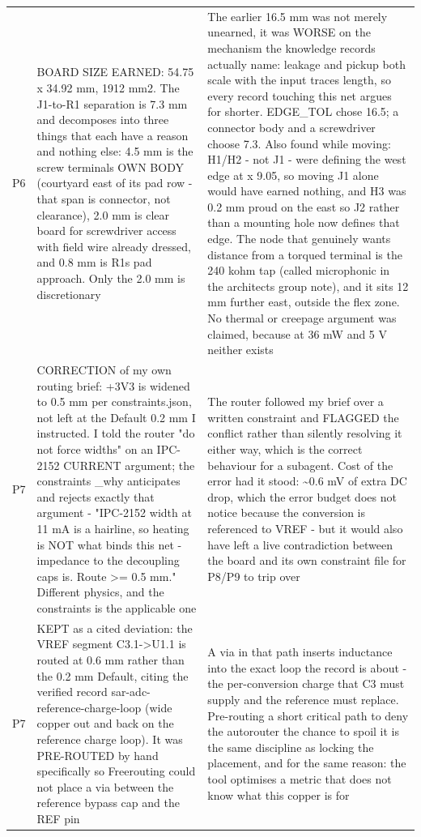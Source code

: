 \documentclass[11pt,a4paper]{article}
\begin{document}
{\begin{longtable}{lp{5.2cm}p{7.2cm}}
P6 & BOARD SIZE EARNED: 54.75 x 34.92 mm, 1912 mm2. The J1-to-R1 separation is 7.3 mm and decomposes into three things that each have a reason and nothing else: 4.5 mm is the screw terminals OWN BODY (courtyard east of its pad row - that span is connector, not clearance), 2.0 mm is clear board for screwdriver access with field wire already dressed, and 0.8 mm is R1s pad approach. Only the 2.0 mm is discretionary & The earlier 16.5 mm was not merely unearned, it was WORSE on the mechanism the knowledge records actually name: leakage and pickup both scale with the input traces length, so every record touching this net argues for shorter. EDGE\_TOL chose 16.5; a connector body and a screwdriver choose 7.3. Also found while moving: H1/H2 - not J1 - were defining the west edge at x 9.05, so moving J1 alone would have earned nothing, and H3 was 0.2 mm proud on the east so J2 rather than a mounting hole now defines that edge. The node that genuinely wants distance from a torqued terminal is the 240 kohm tap (called microphonic in the architects group note), and it sits 12 mm further east, outside the flex zone. No thermal or creepage argument was claimed, because at 36 mW and 5 V neither exists \\
P7 & CORRECTION of my own routing brief: +3V3 is widened to 0.5 mm per constraints.json, not left at the Default 0.2 mm I instructed. I told the router "do not force widths" on an IPC-2152 CURRENT argument; the constraints \_why anticipates and rejects exactly that argument - "IPC-2152 width at 11 mA is a hairline, so heating is NOT what binds this net - impedance to the decoupling caps is. Route \textgreater{}= 0.5 mm." Different physics, and the constraints is the applicable one & The router followed my brief over a written constraint and FLAGGED the conflict rather than silently resolving it either way, which is the correct behaviour for a subagent. Cost of the error had it stood: \textasciitilde{}0.6 mV of extra DC drop, which the error budget does not notice because the conversion is referenced to VREF - but it would also have left a live contradiction between the board and its own constraint file for P8/P9 to trip over \\
P7 & KEPT as a cited deviation: the VREF segment C3.1-\textgreater{}U1.1 is routed at 0.6 mm rather than the 0.2 mm Default, citing the verified record sar-adc-reference-charge-loop (wide copper out and back on the reference charge loop). It was PRE-ROUTED by hand specifically so Freerouting could not place a via between the reference bypass cap and the REF pin & A via in that path inserts inductance into the exact loop the record is about - the per-conversion charge that C3 must supply and the reference must replace. Pre-routing a short critical path to deny the autorouter the chance to spoil it is the same discipline as locking the placement, and for the same reason: the tool optimises a metric that does not know what this copper is for \\

\end{longtable}}
\end{document}
